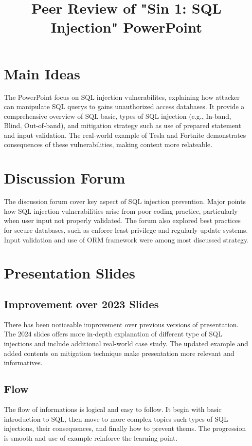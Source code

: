 \documentclass{article}
\title{Peer Review of "Sin 1: SQL Injection" PowerPoint}
\begin{document}
\maketitle

\section{Main Ideas }
The PowerPoint focus on SQL injection vulnerabilites, explaining how attacker can manipulate SQL querys to gains unauthorized access databases. It provide a comprehensive overview of SQL basic, types of SQL injection (e.g., In-band, Blind, Out-of-band), and mitigation strategy such as use of prepared statement and input validation. The real-world example of Tesla and Fortnite demonstrates consequences of these vulnerabilities, making content more relateable.

\section{Discussion Forum}
The discussion forum cover key aspect of SQL injection prevention. Major points how SQL injection vulnerabilities arise from poor coding practice, particularly when user input not properly validated. The forum also explored best practices for secure databases, such as enforce least privilege and regularly update systems. Input validation and use of ORM framework were among most discussed strategy.

\section{Presentation Slides}
\subsection{Improvement over 2023 Slides}
There has been noticeable improvement over previous versions of presentation. The 2024 slides offers more in-depth explanation of different type of SQL injections and include additional real-world case study. The updated example and added contents on mitigation technique make presentation more relevant and informatives.

\subsection{Flow}
The flow of informations is logical and easy to follow. It begin with basic introduction to SQL, then move to more complex topics such types of SQL injections, their consequences, and finally how to prevent thems. The progression is smooth and use of example reinforce the learning point.
\end{document}
